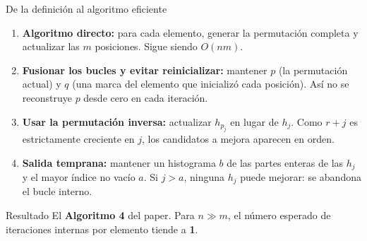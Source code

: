\documentclass[aspectratio=169,11pt]{beamer}
\begin{document}
\begin{frame}{De la definici\'on al algoritmo eficiente}
  \begin{enumerate}
    \item \textbf{Algoritmo directo:} para cada elemento, generar la
          permutaci\'on completa y actualizar las $m$ posiciones.
          Sigue siendo $O(nm)$.
          \medskip
    \item \textbf{Fusionar los bucles y evitar reinicializar:} mantener
          $p$ (la permutaci\'on actual) y $q$ (una marca del elemento que
          inicializ\'o cada posici\'on). As\'i no se reconstruye
          $p$ desde cero en cada iteraci\'on.
          \medskip
    \item \textbf{Usar la permutaci\'on inversa:} actualizar
          $h_{p_j}$ en lugar de $h_j$. Como $r+j$ es estrictamente creciente
          en $j$, los candidatos a mejora aparecen en orden.
          \medskip
    \item \textbf{Salida temprana:} mantener un histograma $b$ de las partes
          enteras de las $h_j$ y el mayor \'indice no vac\'io $a$.
          Si $j>a$, ninguna $h_j$ puede mejorar: se abandona el bucle interno.
  \end{enumerate}
  \vfill
  \begin{block}{Resultado}
    \centering
    \small
    El \textbf{Algoritmo 4} del paper. Para $n\gg m$, el n\'umero esperado de
    iteraciones internas por elemento tiende a \textbf{1}.
  \end{block}
\end{frame}
\end{document}
